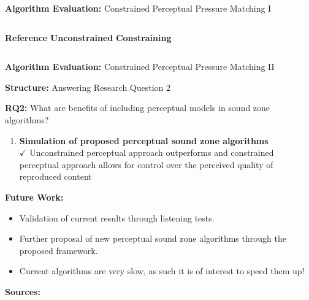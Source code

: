 \documentclass[aspectratio=169]{beamer}
\begin{document}
\begin{frame}{\textbf{Algorithm Evaluation:} Constrained Perceptual Pressure Matching I}
    \begin{columns}[c]
        \centering
        \textbf{Reference}
        \emptybox[5cm]{3cm}
        \centering
        \textbf{Unconstrained}
        \emptybox[5cm]{3cm}
        \centering
        \textbf{Constraining}
        \emptybox[5cm]{3cm}
    \end{columns}
\end{frame}

\begin{frame}{\textbf{Algorithm Evaluation:} Constrained Perceptual Pressure Matching II}
    \begin{figure}[]
        \centering
        \scalebox{0.75}{}
    \end{figure}
\end{frame}

\begin{frame}{\textbf{Structure:} Answering Research Question 2}
    \begin{block}{\textbf{RQ2:} What are benefits of including perceptual models in sound zone algorithms?}
        \begin{enumerate}
            \item \textbf{Simulation of proposed perceptual sound zone algorithms}
                \\{{$\mathbf{\checkmark}$} Unconstrained perceptual approach outperforms and constrained perceptual approach allows for control over the perceived quality of reproduced content}
                \vspace{3pt}\vspace{2.2pt}
        \end{enumerate}
    \end{block}
\end{frame}

\begin{frame}{\textbf{Future Work:}}
    \begin{itemize}
        \item Validation of current results through listening tests. 
        \item Further proposal of new perceptual sound zone algorithms through the proposed framework.
        \item Current algorithms are very slow, as such it is of interest to speed them up!
    \end{itemize}
\end{frame}

\begin{frame}{\textbf{Sources:}}
    \begin{columns}[c]
        \printbibliography
    \end{columns}
\end{frame}
\end{document}
